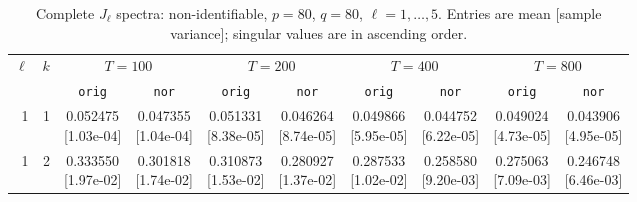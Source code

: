 \documentclass[12pt,letterpaper]{article}
\def\spacingset#1{\renewcommand{\baselinestretch}{#1}\small\normalsize}
\theoremstyle{plain}
\theoremstyle{definition}
\begin{document}
\clearpage
\begin{table}[p]
\begingroup
\spacingset{1.0}
\small\centering
\caption{Complete $J_\ell$ spectra: non-identifiable, $p=80$, $q=80$, $\ell=1,\ldots,5$. Entries are mean [sample variance]; singular values are in ascending order.}
\label{s23:lambda:alltab:spectra:p80q80exterior:1-5}
\footnotesize
\setlength{\tabcolsep}{2.2pt}
\renewcommand{\arraystretch}{1.03}
\begin{adjustbox}{max width=\linewidth}
\begin{tabular}{@{}rr*{8}{c}@{}}
\toprule
$\ell$ & $k$ & \multicolumn{2}{c}{$T=100$} & \multicolumn{2}{c}{$T=200$} & \multicolumn{2}{c}{$T=400$} & \multicolumn{2}{c}{$T=800$}\\
\cmidrule(lr){3-4}\cmidrule(lr){5-6}\cmidrule(lr){7-8}\cmidrule(lr){9-10}
 &  & \texttt{orig} & \texttt{nor} & \texttt{orig} & \texttt{nor} & \texttt{orig} & \texttt{nor} & \texttt{orig} & \texttt{nor}\\
\midrule
1 & 1 & \shortstack{0.052475\\[-1pt]{\scriptsize[1.03e-04]}} & \shortstack{0.047355\\[-1pt]{\scriptsize[1.04e-04]}} & \shortstack{0.051331\\[-1pt]{\scriptsize[8.38e-05]}} & \shortstack{0.046264\\[-1pt]{\scriptsize[8.74e-05]}} & \shortstack{0.049866\\[-1pt]{\scriptsize[5.95e-05]}} & \shortstack{0.044752\\[-1pt]{\scriptsize[6.22e-05]}} & \shortstack{0.049024\\[-1pt]{\scriptsize[4.73e-05]}} & \shortstack{0.043906\\[-1pt]{\scriptsize[4.95e-05]}}\\
1 & 2 & \shortstack{0.333550\\[-1pt]{\scriptsize[1.97e-02]}} & \shortstack{0.301818\\[-1pt]{\scriptsize[1.74e-02]}} & \shortstack{0.310873\\[-1pt]{\scriptsize[1.53e-02]}} & \shortstack{0.280927\\[-1pt]{\scriptsize[1.37e-02]}} & \shortstack{0.287533\\[-1pt]{\scriptsize[1.02e-02]}} & \shortstack{0.258580\\[-1pt]{\scriptsize[9.20e-03]}} & \shortstack{0.275063\\[-1pt]{\scriptsize[7.09e-03]}} & \shortstack{0.246748\\[-1pt]{\scriptsize[6.46e-03]}}\\

\end{tabular}
\end{adjustbox}
\end{table}
\end{document}
